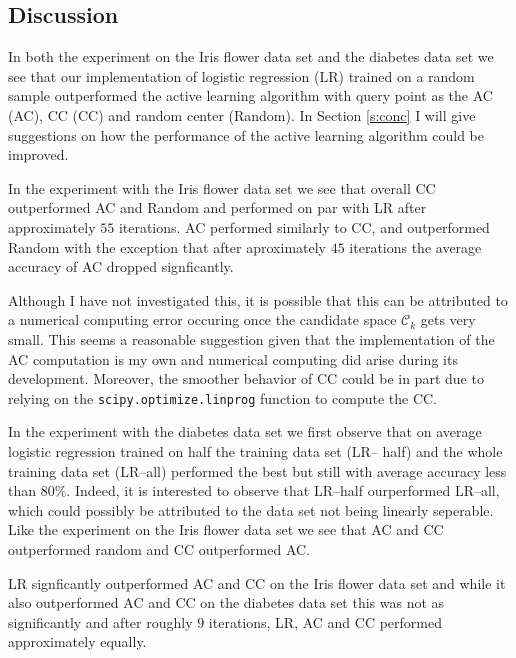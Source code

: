 \documentclass[11pt]{amsart}
\theoremstyle{definition}
\theoremstyle{remark}
\begin{document}

    \subsection{Discussion}
        In both the experiment on the Iris flower data set and the diabetes data set we see that our implementation of logistic regression (LR) trained on a random sample outperformed the active learning algorithm with query point as the AC (AC), CC (CC) and random center (Random). In Section \ref{s:conc} I will give suggestions on how the performance of the active learning algorithm could be improved.

        In the experiment with the Iris flower data set we see that overall CC outperformed AC and Random and performed on par with LR after approximately $55$ iterations. AC performed similarly to CC, and outperformed Random with the exception that after aproximately $45$ iterations the average accuracy of AC dropped signficantly. 

        Although I have not investigated this, it is possible that this can be attributed to a numerical computing error occuring once the candidate space $\mathcal{C}_k$ gets very small. This seems a reasonable suggestion given that the implementation of the AC computation is my own and numerical computing did arise during its development. Moreover, the smoother behavior of CC could be in part due to relying on the \texttt{scipy.optimize.linprog} function to compute the CC. 

        In the experiment with the diabetes data set we first observe that on average logistic regression trained on half the training data set (LR-- half) and the whole training data set (LR--all) performed the best but still with average accuracy less than 80\%. Indeed, it is interested to observe that LR--half ourperformed LR--all, which could possibly be attributed to the data set not being linearly seperable. Like the experiment on the Iris flower data set we see that AC and CC outperformed random and CC outperformed AC.

        LR signficantly outperformed AC and CC on the Iris flower data set and while it also outperformed AC and CC on the diabetes data set this was not as significantly and after roughly $9$ iterations, LR, AC and CC performed approximately equally. 
\end{document}
